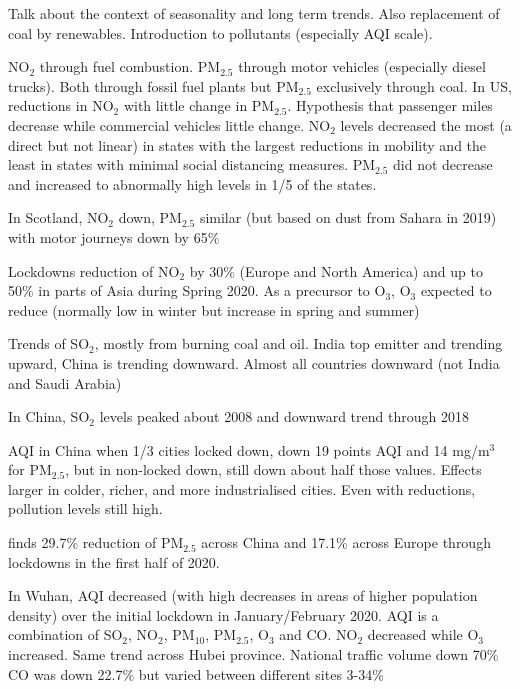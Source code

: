 \documentclass[final,3p,times,authoryear]{elsarticle}
\begin{document}
Talk about the context of seasonality and long term trends. Also replacement of coal by renewables. Introduction to pollutants (especially AQI scale).




NO$_{2}$ through fuel combustion. PM$_{2.5}$ through motor vehicles (especially diesel trucks). Both through fossil fuel plants but PM$_{2.5}$ exclusively through coal. In US, reductions in NO$_{2}$ with little change in PM$_{2.5}$. Hypothesis that passenger miles decrease while commercial vehicles little change. NO$_{2}$ levels decreased the most (a direct but not linear) in states with the largest reductions in mobility and the least in states with minimal social distancing measures. PM$_{2.5}$ did not decrease and increased to abnormally high levels in 1/5 of the states. \citep{Archer2020}


In Scotland, NO$_{2}$ down, PM$_{2.5}$ similar (but based on dust from Sahara in 2019) with motor journeys down by 65\%\citep{Dobson2020}

Lockdowns reduction of NO$_{2}$ by 30\% (Europe and North America) and up to 50\% in parts of Asia during Spring 2020. As a precursor to O$_{3}$, O$_{3}$ expected to reduce (normally low in winter but increase in spring and summer) \citep{Dentener2020}

Trends of SO$_{2}$, mostly from burning coal and oil. India top emitter and trending upward, China is trending downward. Almost all countries downward (not India and Saudi Arabia)
\citep{Dahiya2019}

In China, SO$_{2}$ levels peaked about 2008 and downward trend through 2018 \citep{Wang2018b}

AQI in China when 1/3 cities locked down, down 19 points AQI and 14 mg/m$^{3}$ for PM$_{2.5}$, but in non-locked down, still down about half those values. Effects larger in colder, richer, and more industrialised cities. Even with reductions, pollution levels still high. \citep{He2020}


\cite{Giani2019} finds 29.7\% reduction of PM$_{2.5}$ across China and 17.1\% across Europe through lockdowns in the first half of 2020.

In Wuhan, AQI decreased (with high decreases in areas of higher population density) over the initial lockdown in January/February 2020. AQI is a combination of SO$_{2}$, NO$_{2}$, PM$_{10}$, PM$_{2.5}$, O$_{3}$ and CO. NO$_{2}$ decreased while O$_{3}$ increased. Same trend across Hubei province. National traffic volume down 70\% CO was down 22.7\% but varied between different sites 3-34\% \citep{Lian2020}
\end{document}
